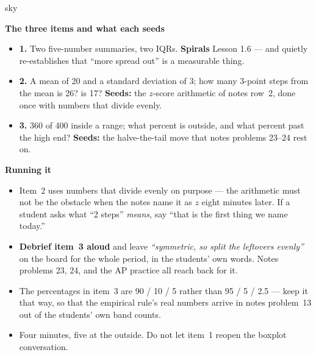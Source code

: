 \documentclass[10pt]{article}
\begin{document}
\boxguard[20]
\begin{skillbox}{sky}
\begin{minipage}[t]{0.48\linewidth}
    \textbf{The three items and what each seeds}
    \begin{itemize}
        \item \textbf{1.} Two five-number summaries, two IQRs. \textbf{Spirals} Lesson 1.6 ---
              and quietly re-establishes that ``more spread out'' is a measurable thing.
        \item \textbf{2.} A mean of 20 and a standard deviation of 3; how many 3-point steps
              from the mean is 26? is 17? \textbf{Seeds:} the $z$-score arithmetic of notes
              row~2, done once with numbers that divide evenly.
        \item \textbf{3.} 360 of 400 inside a range; what percent is outside, and what percent
              past the high end? \textbf{Seeds:} the halve-the-tail move that notes problems
              23--24 rest on.
    \end{itemize}
\end{minipage}
\hfill
\begin{minipage}[t]{0.48\linewidth}
    \textbf{Running it}
    \begin{itemize}
        \item Item~2 uses numbers that divide evenly on purpose --- the arithmetic must not be
              the obstacle when the notes name it as $z$ eight minutes later. If a student asks
              what ``2 steps'' \emph{means}, say ``that is the first thing we name today.''
        \item \textbf{Debrief item~3 aloud} and leave \emph{``symmetric, so split the leftovers
              evenly''} on the board for the whole period, in the students' own words. Notes
              problems 23, 24, and the AP practice all reach back for it.
        \item The percentages in item~3 are 90 / 10 / 5 rather than 95 / 5 / 2.5 --- keep it
              that way, so that the empirical rule's real numbers arrive in notes problem~13
              out of the students' own band counts.
        \item Four minutes, five at the outside. Do not let item~1 reopen the boxplot
              conversation.
    \end{itemize}
\end{minipage}
\end{skillbox}
\end{document}

